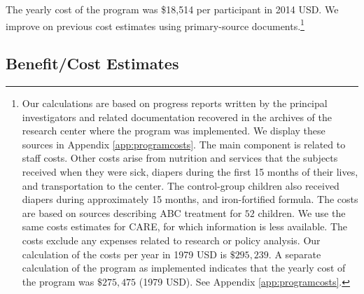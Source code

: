 The yearly cost of the program was \$18,514 per participant in 2014 USD. We improve on previous cost estimates using primary-source documents.\footnote{Our calculations are based on progress reports written by the principal investigators and related documentation recovered in the archives of the research center where the program was implemented. We display these sources in Appendix \ref{app:programcosts}. The main component is related to staff costs. Other costs arise from nutrition and services that the subjects received when they were sick, diapers during the first 15 months of their lives, and transportation to the center. The control-group children also received diapers during approximately 15 months, and iron-fortified formula. The costs are based on sources describing ABC treatment for $52$ children. We use the same costs estimates for CARE, for which information is less available. The costs exclude any expenses related to research or policy analysis. Our calculation of the costs per year in 1979 USD is $\$295,239$. A separate calculation of the program as implemented indicates that the yearly cost of the program was $\$275,475$ (1979 USD). See Appendix \ref{app:programcosts}.}

\subsection{Benefit/Cost Estimates}

